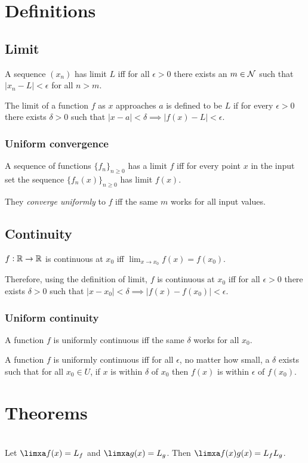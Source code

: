 \section{Definitions}
\subsection{Limit}
A sequence $(x_n)$ has limit $L$ iff for all $\epsilon > 0$ there exists an
$m \in \mathcal{N}$ such that $|x_n - L| < \epsilon$ for all $n > m$.

The limit of a function $f$ as $x$ approaches $a$ is defined to be $L$ if for every $\epsilon > 0$
there exists $\delta > 0$ such that $|x - a| < \delta \implies |f(x) - L| < \epsilon$.

\subsubsection{Uniform convergence}
A sequence of functions $\{f_n\}_{n\geq 0}$ has a limit $f$ iff for every point
$x$ in the input set the sequence $\{f_n(x)\}_{n\geq 0}$ has limit $f(x)$.

They \textit{converge uniformly} to $f$ iff the same $m$ works for all input
values.

\subsection{Continuity}
$f:\mathbb{R}\to\mathbb{R}$ is continuous at $x_0$ iff $\lim_{x\to x_0} f(x) = f(x_0)$.

Therefore, using the definition of limit, $f$ is continuous at $x_0$ iff for all $\epsilon > 0$
there exists $\delta > 0$ such that $|x - x_0| < \delta \implies |f(x) - f(x_0)| < \epsilon$.

\subsubsection{Uniform continuity}
A function $f$ is uniformly continuous iff the same $\delta$ works for all $x_0$.

A function $f$ is uniformly continuous iff for all $\epsilon$, no matter how
small, a $\delta$ exists such that for all $x_0 \in U$, if $x$ is within
$\delta$ of $x_0$ then $f(x)$ is within $\epsilon$ of $f(x_0)$.

\section{Theorems}
\begin{theorem}\label{limit-of-product}~\\
  Let $\limxa f(x) = L_f$ and $\limxa g(x) = L_g$. Then
  $\limxa f(x)g(x) = L_fL_g$.
\end{theorem}

